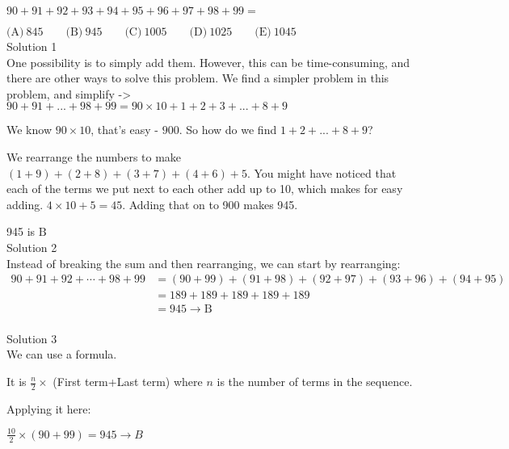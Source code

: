 

$90+91+92+93+94+95+96+97+98+99=$


$\text{(A)}\ 845 \qquad \text{(B)}\ 945 \qquad \text{(C)}\ 1005 \qquad \text{(D)}\ 1025 \qquad \text{(E)}\ 1045$
\\
Solution 1
\\
One possibility is to simply add them. However, this can be time-consuming, and there are other ways to solve this problem. We find a simpler problem in this problem, and simplify -> $90 + 91 + ... + 98 + 99 = 90 \times 10 + 1 + 2 + 3 + ... + 8 + 9$

We know $90 \times 10$, that's easy - $900$. So how do we find $1 + 2 + ... + 8 + 9$?

We rearrange the numbers to make $(1 + 9) + (2 + 8) + (3 + 7) + (4 + 6) + 5$. You might have noticed that each of the terms we put next to each other add up to 10, which makes for easy adding. $4 \times 10 + 5 = 45$. Adding that on to 900 makes 945.

945 is $\boxed{\text{B}}$
\\
Solution 2
\\
Instead of breaking the sum and then rearranging, we can start by rearranging: \begin{align*} 90+91+92+\cdots +98+99 &=  (90+99)+(91+98)+(92+97)+(93+96)+(94+95) \\ &= 189+189+189+189+189 \\ &= 945\rightarrow \boxed{\text{B}}  \end{align*}
\\
Solution 3
\\
We can use a formula.

It is $\frac{n}{2}\times$ (First term+Last term) where $n$ is the number of terms in the sequence.

Applying it here:

$\frac{10}{2} \times (90+99) = 945 \rightarrow \boxed{B}$
